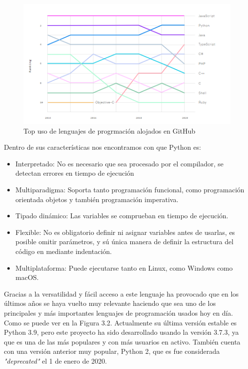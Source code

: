 \documentclass[a4paper, 12pt]{book}
\begin{document}
\begin{figure}
	\centering
	\includegraphics[width=18cm]{img/top_programing_languajes.png}
	\caption{Top uso de lenguajes de progrmación alojados en GitHub}
	\label{fig:Top_programming}
\end{figure}

Dentro de sus características nos encontramos con que Python es: 
\begin{itemize}
	\item Interpretado: No es necesario que sea procesado por el compilador, se detectan errores en tiempo de ejecución 
	\item Multiparadigma: Soporta tanto programación funcional, como programación orientada objetos y también programación imperativa.  
	\item Tipado dinámico: Las variables se comprueban en tiempo de ejecución. 
	\item Flexible: No es obligatorio definir ni asignar variables antes de usarlas, es posible omitir parámetros, y sú única manera de definir la estructura del código en mediante indentación.
	\item Multiplataforma: Puede ejecutarse tanto en Linux, como Windows como macOS. 
\end{itemize}


Gracias a la versatilidad y fácil acceso a este lenguaje ha provocado que en los últimos años se haya vuelto muy relevante haciendo que sea uno de los principales y más importantes lenguajes de programación usados hoy en día. Como se puede ver en la Figura 3.2.
Actualmente su última versión estable es Python 3.9, pero este proyecto ha sido desarrollado usando la versión 3.7.3, ya que es una de las más populares y con más usuarios en activo. También cuenta con una versión anterior muy popular, Python 2, que es fue considerada \emph{"deprecated"} el 1 de enero de 2020. 
\end{document}
